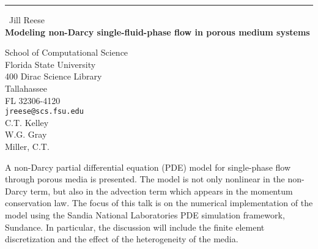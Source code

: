 \documentclass{report}
\begin{document}
\begin{center}
\rule{6in}{1pt} \
{\large Jill Reese \\
{\bf Modeling non-Darcy single-fluid-phase flow in porous medium systems }}

School of Computational Science \\ Florida State University \\ 400 Dirac Science Library \\ Tallahassee \\ FL 32306-4120
\\
{\tt jreese@scs.fsu.edu}\\
C.T. Kelley\\
W.G. Gray\\
	Miller, C.T.\end{center}

A non-Darcy partial differential equation (PDE) model for single-phase
flow through porous media is presented. The model is not only nonlinear
in the non-Darcy term, but also in the advection term which appears in
the momentum conservation law. The focus of this talk is on the numerical
implementation of the model using the Sandia National Laboratories PDE
simulation framework, Sundance. In particular, the discussion will
include the finite element discretization and the effect of the
heterogeneity of the media.
\end{document}

